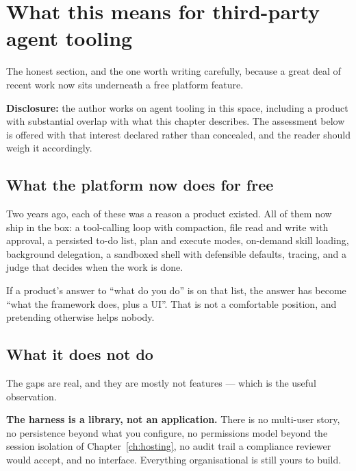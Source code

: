 \section{What this means for third-party agent tooling}
\label{sec:harness-tooling}

The honest section, and the one worth writing carefully, because a great deal of
recent work now sits underneath a free platform feature.

\begin{note}
\textbf{Disclosure:} the author works on agent tooling in this space, including a
product with substantial overlap with what this chapter describes. The assessment
below is offered with that interest declared rather than concealed, and the
reader should weigh it accordingly.
\end{note}

\subsection{What the platform now does for free}

Two years ago, each of these was a reason a product existed. All of them now ship
in the box: a tool-calling loop with compaction, file read and write with
approval, a persisted to-do list, plan and execute modes, on-demand skill
loading, background delegation, a sandboxed shell with defensible defaults,
tracing, and a judge that decides when the work is done.

If a product's answer to ``what do you do'' is on that list, the answer has
become ``what the framework does, plus a UI''. That is not a comfortable
position, and pretending otherwise helps nobody.

\subsection{What it does not do}

The gaps are real, and they are mostly not features --- which is the useful
observation.

\textbf{The harness is a library, not an application.} There is no multi-user
story, no persistence beyond what you configure, no permissions model beyond the
session isolation of Chapter~\ref{ch:hosting}, no audit trail a compliance
reviewer would accept, and no interface. Everything organisational is still
yours to build.

